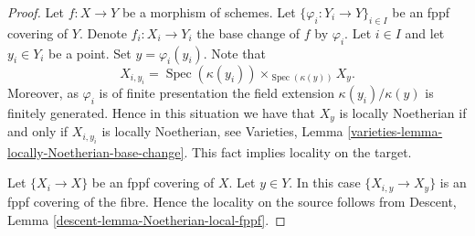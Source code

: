 \documentclass[10pt,a4paper]{amsart}
\theoremstyle{plain}
\theoremstyle{definition}
\theoremstyle{remark}
\numberwithin{equation}{subsection}
\def\Spec{\mathop{\mathrm{Spec}}}
\begin{document}
\begin{proof}
Let $f : X \to Y$ be a morphism of schemes.
Let $\{\varphi_i : Y_i \to Y\}_{i \in I}$ be an fppf covering of $Y$.
Denote $f_i : X_i \to Y_i$ the base change of $f$ by $\varphi_i$.
Let $i \in I$ and let $y_i \in Y_i$ be a point.
Set $y = \varphi_i(y_i)$. Note that
$$
X_{i, y_i} = \Spec(\kappa(y_i)) \times_{\Spec(\kappa(y))} X_y.
$$
Moreover, as $\varphi_i$ is of finite presentation the field extension
$\kappa(y_i)/\kappa(y)$ is finitely generated.
Hence in this situation we have that $X_y$ is locally Noetherian if and
only if $X_{i, y_i}$ is locally Noetherian, see
Varieties, Lemma \ref{varieties-lemma-locally-Noetherian-base-change}.
This fact implies locality on the target.

\medskip\noindent
Let $\{X_i \to X\}$ be an fppf covering of $X$.
Let $y \in Y$. In this case $\{X_{i, y} \to X_y\}$ is an
fppf covering of the fibre. Hence the locality on the source
follows from Descent, Lemma \ref{descent-lemma-Noetherian-local-fppf}.
\end{proof}
\end{document}
